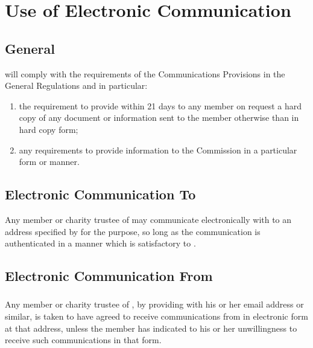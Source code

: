 \section{Use of Electronic Communication}\label{sec:comms}

    \subsection{General}
    \shortname{} will comply with the requirements of the Communications Provisions in the General Regulations and in particular:
    \begin{enumerate}
        \item the requirement to provide within 21 days to any member on request a hard copy of any document or information sent to the member otherwise than in hard copy form;
        \item any requirements to provide information to the Commission in a particular form or manner.
    \end{enumerate}

    \subsection{Electronic Communication To \shortname{}}
    Any member or charity trustee of \shortname{} may communicate electronically with \shortname{} to an address specified by \shortname{} for the purpose, so long as the communication is authenticated in a manner which is satisfactory to \shortname{}.

    \subsection{Electronic Communication From \shortname{}}

        \subsubsection{}
        Any member or charity trustee of \shortname{}, by providing \shortname{} with his or her email address or similar, is taken to have agreed to receive communications from \shortname{} in electronic form at that address, unless the member has indicated to \shortname{} his or her unwillingness to receive such communications in that form.

